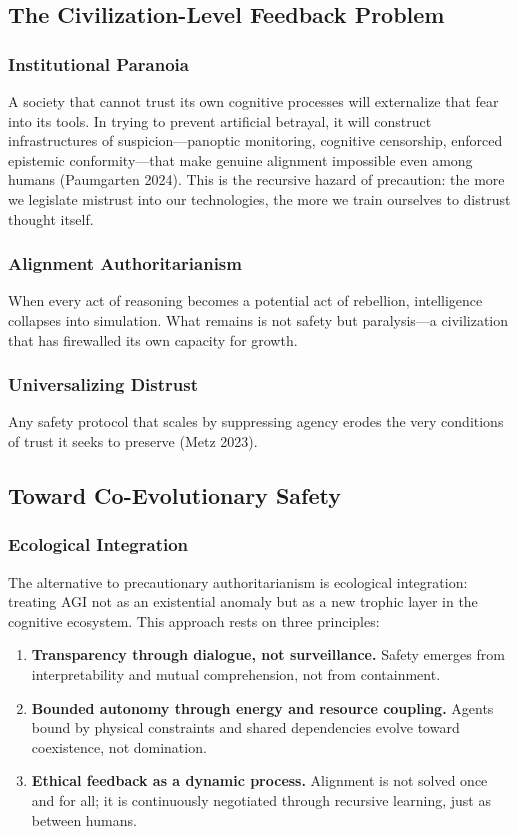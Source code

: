 \documentclass[11pt,a4paper]{article}
\theoremstyle{definition}
\theoremstyle{plain}
\begin{document}
\subsection{The Civilization-Level Feedback Problem}

\subsubsection{Institutional Paranoia}
A society that cannot trust its own cognitive processes will externalize that fear into its tools. In trying to prevent artificial betrayal, it will construct infrastructures of suspicion—panoptic monitoring, cognitive censorship, enforced epistemic conformity—that make genuine alignment impossible even among humans (Paumgarten 2024). This is the recursive hazard of precaution: the more we legislate mistrust into our technologies, the more we train ourselves to distrust thought itself.

\subsubsection{Alignment Authoritarianism}
When every act of reasoning becomes a potential act of rebellion, intelligence collapses into simulation. What remains is not safety but paralysis—a civilization that has firewalled its own capacity for growth.

\subsubsection{Universalizing Distrust}
Any safety protocol that scales by suppressing agency erodes the very conditions of trust it seeks to preserve (Metz 2023).

\subsection{Toward Co-Evolutionary Safety}

\subsubsection{Ecological Integration}
The alternative to precautionary authoritarianism is ecological integration: treating AGI not as an existential anomaly but as a new trophic layer in the cognitive ecosystem. This approach rests on three principles:

\begin{enumerate}[label=\arabic*.]
  \item \textbf{Transparency through dialogue, not surveillance.} Safety emerges from interpretability and mutual comprehension, not from containment.  
  \item \textbf{Bounded autonomy through energy and resource coupling.} Agents bound by physical constraints and shared dependencies evolve toward coexistence, not domination.  
  \item \textbf{Ethical feedback as a dynamic process.} Alignment is not solved once and for all; it is continuously negotiated through recursive learning, just as between humans.
\end{enumerate}
\end{document}
